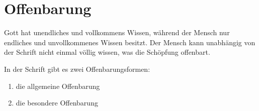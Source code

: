 \section{Offenbarung}

Gott hat unendliches und vollkommens Wissen, während der Mensch nur endliches und unvollkommenes Wissen besitzt. Der Mensch kann unabhängig von der Schrift nicht einmal völlig wissen, was die Schöpfung offenbart.

In der Schrift gibt es zwei Offenbarungsformen:
\begin{enumerate}
    \item die allgemeine Offenbarung 
    \item die besondere Offenbarung 
\end{enumerate}

